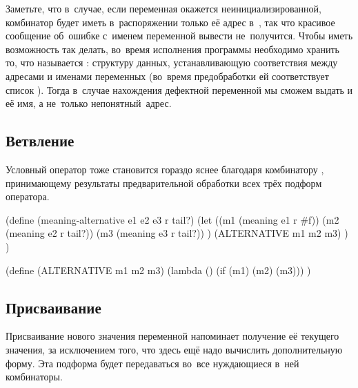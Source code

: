 Заметьте, что в~случае, если переменная окажется неинициализированной,
комбинатор  будет иметь в~распоряжении только её адрес
в~, так что красивое сообщение об~ошибке с~именем переменной
вывести не~получится. Чтобы иметь возможность так делать, во~время исполнения
программы необходимо хранить то, что называется :
структуру данных, устанавливающую соответствия между адресами и именами
переменных (во~время предобработки ей соответствует список ).
 Тогда в~случае нахождения дефектной переменной мы
сможем выдать и её имя, а не~только непонятный~адрес.


\subsection{Ветвление}\label{fast/dilute/ssect:conditional}

Условный оператор тоже становится гораздо яснее благодаря комбинатору
, принимающему результаты предварительной обработки всех трёх
подформ оператора.

\begin{code:lisp}
(define (meaning-alternative e1 e2 e3 r tail?)
  (let ((m1 (meaning e1 r #f))
        (m2 (meaning e2 r tail?))
        (m3 (meaning e3 r tail?)) )
    (ALTERNATIVE m1 m2 m3) ) )

(define (ALTERNATIVE m1 m2 m3)
  (lambda ()
    (if (m1) (m2) (m3))) )
\end{code:lisp}


\subsection{Присваивание}\label{fast/dilute/ssect:assignment}

Присваивание нового значения переменной напоминает получение её текущего
значения, за исключением того, что здесь ещё надо вычислить дополнительную
форму. Эта подформа будет передаваться во~все нуждающиеся в~ней комбинаторы.

